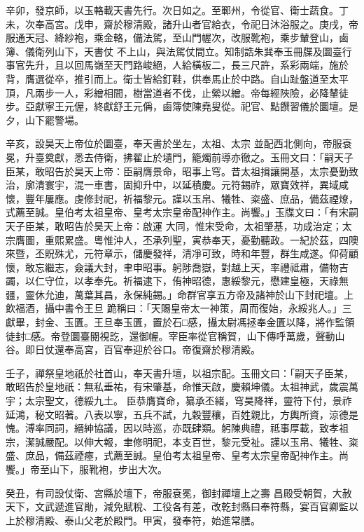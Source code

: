 \begin{pinyinscope}
 辛卯，發京師，以玉輅載天書先行。次日如之。至鄆州，令從官、衛士蔬食。丁未，次奉高宮。戊申，齋於穆清殿，諸升山者官給衣，令祀日沐浴服之。庚戌，帝服通天冠、絳紗袍，乘金輅，備法駕，至山門幄次，改服靴袍，乘步輦登山，鹵簿、儀衛列山下，天書仗
 不上山，與法駕仗間立。知制誥朱巽奉玉冊牒及圜臺行事官先升，且以回馬嶺至天門路峻絕，人給橫板二，長三尺許，系彩兩端，施於背，膺選從卒，推引而上。衛士皆給釘鞋，供奉馬止於中路。自山趾盤道至太平頂，凡兩步一人，彩繒相間，樹當道者不伐，止縈以繒。帝每經陜險，必降輦徒步。亞獻寧王元偓，終獻舒王元偁，鹵簿使陳堯叟從。祀官、點饌習儀於圜壇。是夕，山下罷警場。



 辛亥，設昊天上帝位於圜臺，奉天書於坐左，太祖、太宗
 並配西北側向，帝服袞冕，升臺奠獻，悉去侍衛，拂翟止於壝門，籠燭前導亦徹之。玉冊文曰：「嗣天子臣某，敢昭告於昊天上帝：臣嗣膺景命，昭事上穹。昔太祖揖讓開基，太宗憂勤致治，廓清寰宇，混一車書，固抑升中，以延積慶。元符錫祚，眾寶效祥，異域咸懷，豐年屢應。虔修封祀，祈福黎元。謹以玉帛、犧牲、粢盛、庶品，備茲禋燎，式薦至誠。皇伯考太祖皇帝、皇考太宗皇帝配神作主。尚饗。」玉牒文曰：「有宋嗣天子臣某，敢昭告於昊天上帝：啟運
 大同，惟宋受命，太祖肇基，功成治定；太宗膺圖，重熙累盛。粵惟沖人，丕承列聖，寅恭奉天，憂勤聽政。一紀於茲，四隩來暨，丕貺殊尤，元符章示，儲慶發祥，清凈可致，時和年豐，群生咸遂。仰荷顧懷，敢忘繼志，僉議大封，聿申昭事。躬陟喬嶽，對越上天，率禮祗肅，備物吉蠲，以仁守位，以孝奉先。祈福逮下，侑神昭德，惠綏黎元，懋建皇極，天祿無疆，靈休允迪，萬葉其昌，永保純錫。」命群官享五方帝及諸神於山下封祀壇。上飲福酒，攝中書令王旦
 跪稱曰：「天賜皇帝太一神策，周而復始，永綏兆人。」三獻畢，封金、玉匱。王旦奉玉匱，置於石□感，攝太尉馮拯奉金匱以降，將作監領徒封□感。帝登圜臺閱視訖，還御幄。宰臣率從官稱賀，山下傳呼萬歲，聲動山谷。即日仗還奉高宮，百官奉迎於谷口。帝復齋於穆清殿。



 壬子，禪祭皇地祇於社首山，奉天書升壇，以祖宗配。玉冊文曰：「嗣天子臣某，敢昭告於皇地祇：無私垂祐，有宋肇基，命惟天啟，慶賴坤儀。太祖神武，歲震萬宇；太宗聖文，德綏九土。
 臣恭膺寶命，纂承丕緒，穹昊降祥，靈符下付，景祚延鴻，秘文昭著。八表以寧，五兵不試，九穀豐穰，百姓親比，方輿所資，涼德是愧。溥率同詞，縉紳協議，因以時巡，亦既肆類。躬陳典禮，祗事厚載，致孝祖宗，潔誠嚴配。以伸大報，聿修明祀，本支百世，黎元受祉。謹以玉帛、犧牲、粢盛、庶品，備茲禋瘞，式薦至誠。皇伯考太祖皇帝、皇考太宗皇帝配神作主。尚饗。」帝至山下，服靴袍，步出大次。



 癸丑，有司設仗衛、宮縣於壇下，帝服袞冕，御封禪壇上之壽
 昌殿受朝賀，大赦天下，文武遞進官勛，減免賦稅、工役各有差，改乾封縣曰奉符縣，宴百官卿監以上於穆清殿、泰山父老於殿門。甲寅，發奉符，始進常膳。




\end{pinyinscope}
